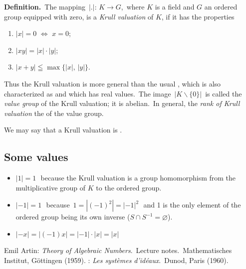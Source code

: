 \documentclass[12pt]{article}
\begin{document}
\textbf{Definition.}\, The mapping\, $|.|\!:\, K\to G$,\, where $K$ is a field and $G$ an ordered group equipped with zero, is a {\em Krull valuation} of $K$, if it has the properties
\begin{enumerate}
 \item $|x| = 0 \,\,\Leftrightarrow\,\, x = 0$;
 \item $|xy| = |x|\cdot|y|$;
 \item $|x+y| \leqq \max\{|x|,\,|y|\}$.
\end{enumerate}

Thus the Krull valuation is more general than the usual , which is also characterized as  and which has real values.\, The image\, $|K\!\smallsetminus\!\{0\}|$\, is called the {\em value group} of the Krull valuation; it is abelian.\, In general, the {\em rank of Krull valuation}  the  of the value group.

We may say that a Krull valuation is .

\subsection*{Some values}
\begin{itemize}
 \item $|1| = 1$\,\, because the Krull valuation is a group homomorphism from the multiplicative group of $K$ to the ordered group.
 \item $|-1| = 1$\,\, because\, $1 = |(-1)^2| = |-1|^2$\,\, and 1 is the only element of the ordered group being its own inverse ($S\cap S^{-1} = \varnothing$).
 \item $|-x| = |(-1)x| = |-1|\cdot|x| = |x|$
\end{itemize}

\begin{thebibliography}{9}
 {\sc Emil Artin}: {\em Theory of Algebraic Numbers}.\, Lecture notes.\, Mathematisches Institut, G\"ottingen (1959).
: {\em Les syst\`emes d'id\'eaux}.\, Dunod, Paris (1960).
\end{thebibliography}

\end{document}
